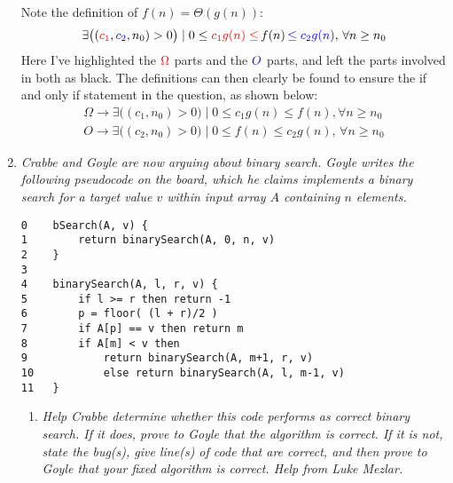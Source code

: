 \documentclass[12pt]{article}
\begin{document}
\begin{enumerate}
    Note the definition of $f(n)=\Theta(g(n))$: 
    \begin{align*}
    \exists \big((\textcolor{red}{c_1},\textcolor{blue}{c_2},n_0)>0\big) \mid 0\leq \textcolor{red}{c_1 g(n) \leq}\,f(n)\,\textcolor{blue}{\leq c_2 g(n)}, \, \forall n\geq n_0
    \end{align*}
	Here I've highlighted the $\textcolor{red}{\Omega}$ parts and the $\textcolor{blue}{O}$ parts, and left the parts involved in both as black. The definitions can then clearly be found to ensure the if and only if statement 
in the question, as shown below: 
	\begin{align*}
	\Omega \rightarrow \exists \big((c_1,n_0)>0\big) \mid 0\leq c_1 g(n) \leq f(n), \forall n\geq n_0 \\
    O \rightarrow \exists \big((c_2,n_0)>0\big) \mid 0\leq f(n)\leq c_2 g(n), \, \forall n\geq n_0
	\end{align*}
    
    \newpage
    \item \textit{Crabbe and Goyle are now arguing about binary search. Goyle writes
the following pseudocode on the board, which he claims implements a binary search
for a target value $v$ within input array $A$ containing $n$ elements.}
    \begin{verbatim}
0    bSearch(A, v) {
1        return binarySearch(A, 0, n, v)
2    }
3
4    binarySearch(A, l, r, v) {
5        if l >= r then return -1
6        p = floor( (l + r)/2 )
7        if A[p] == v then return m
8        if A[m] < v then
9            return binarySearch(A, m+1, r, v)
10           else return binarySearch(A, l, m-1, v)
11   }
    \end{verbatim}
	\begin{enumerate} 
	\item \textit{Help Crabbe determine whether this code performs as correct binary search. If it does, prove to Goyle that the algorithm is correct. If it is not, state the bug(s), give line(s) of code that are correct, and 
then prove to Goyle that your fixed algorithm is correct. Help from Luke Mezlar.}
    

\end{enumerate}
\end{enumerate}
\end{document}
